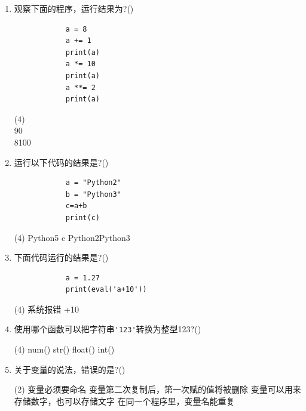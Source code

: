 \documentclass[11pt]{ctexart}
\begin{document}
\begin{enumerate}
        \item 观察下面的程序，运行结果为?(\qquad)
        \begin{lstlisting}
            a = 8
            a += 1
            print(a)
            a *= 10
            print(a)
            a **= 2
            print(a)
        \end{lstlisting}
        \begin{tasks}(4)
             \\ 90 \\ 8100
        \end{tasks}

        \item 运行以下代码的结果是?(\qquad)
        \begin{lstlisting}
            a = "Python2"
            b = "Python3"
            c=a+b
            print(c)
        \end{lstlisting}
        \begin{tasks}(4)
            \task Python5
            \task c
            \task Python2Python3
        \end{tasks}

        \item 下面代码运行的结果是?(\qquad)
        \begin{lstlisting}
            a = 1.27
            print(eval('a+10'))
        \end{lstlisting}
        \begin{tasks}(4)
            \task 系统报错
            +10
        \end{tasks}

        \item 使用哪个函数可以把字符串\lstinline!'123'!转换为整型123?(\qquad)
        \begin{tasks}(4)
            \task num()
            \task str()
            \task float()
            \task int()
        \end{tasks}

        \newpage
        \item 关于变量的说法，错误的是?(\qquad)
        \begin{tasks}(2)
            \task 变量必须要命名
            \task 变量第二次复制后，第一次赋的值将被删除
            \task 变量可以用来存储数字，也可以存储文字
            \task 在同一个程序里，变量名能重复
        \end{tasks}


\end{enumerate}
\end{document}
